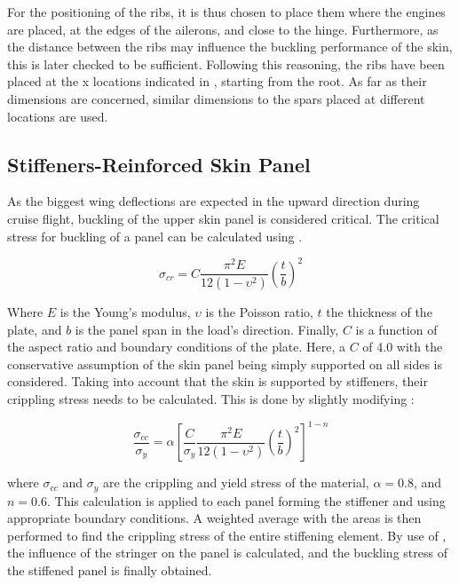 For the positioning of the ribs, it is thus chosen to place them where the engines are placed, at the edges of the ailerons, and close to the hinge.
Furthermore, as the distance between the ribs may influence the buckling performance of the skin, this is later checked to be sufficient.
Following this reasoning, the ribs have been placed at the x locations indicated in , starting from the root.
As far as their dimensions are concerned, similar dimensions to the spars placed at different locations are used.


\subsection{Stiffeners-Reinforced Skin Panel}
As the biggest wing deflections are expected in the upward direction during cruise flight, buckling of the upper skin panel is considered critical. 
The critical stress for buckling of a panel can be calculated using .

\begin{equation}
\label{eq:buckling}
    \sigma_{cr} = C \frac{\pi^2E}{12(1-\upsilon^2)} \left(\frac{t}{b}\right)^2
\end{equation}


Where $E$ is the Young’s modulus, $\upsilon$ is the Poisson ratio, $t$ the thickness of the plate, and $b$ is the panel span in the load’s direction.
Finally, $C$ is a function of the aspect ratio and boundary conditions of the plate.
Here, a $C$ of 4.0 with the conservative assumption of the skin panel being simply supported on all sides is considered.
Taking into account that the skin is supported by stiffeners, their crippling stress needs to be calculated.
This is done by slightly modifying :

\begin{equation}
\label{eq:crippling}
    \frac{\sigma_{cc}}{\sigma_y} = \alpha \left[\frac{C}{\sigma_y} \frac{\pi^2E}{12(1-\upsilon^2)} \left( \frac{t}{b} \right)^2\right]^{1-n}
\end{equation}

where $\sigma_{cc}$ and $\sigma_y$ are the crippling and yield stress of the material, $\alpha = 0.8$, and $n = 0.6$. This calculation is applied to each panel forming the stiffener and using appropriate boundary conditions.
A weighted average with the areas is then performed to find the crippling stress of the entire stiffening element.
By use of , the influence of the stringer on the panel is calculated, and the buckling stress of the stiffened panel is finally obtained.


